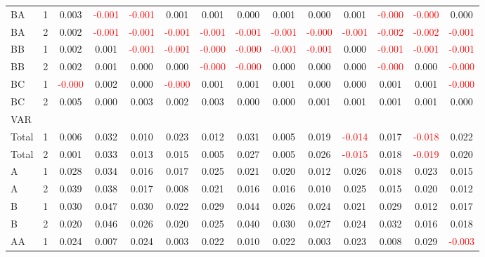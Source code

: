 \begin{table}[!htb]
{\begin{tabular}{llcccccccccccc}
BA & 1 & 0.003 & \textcolor{red}{-0.001} & \textcolor{red}{-0.001} & 0.001 & 0.001 & 0.000 & 0.001 & 0.000 & 0.001 & \textcolor{red}{-0.000} & \textcolor{red}{-0.000} & 0.000\\
BA & 2 & 0.002 & \textcolor{red}{-0.001} & \textcolor{red}{-0.001} & \textcolor{red}{-0.001} & \textcolor{red}{-0.001} & \textcolor{red}{-0.001} & \textcolor{red}{-0.001} & \textcolor{red}{-0.000} & \textcolor{red}{-0.001} & \textcolor{red}{-0.002} & \textcolor{red}{-0.002} & \textcolor{red}{-0.001}\\
BB & 1 & 0.002 & 0.001 & \textcolor{red}{-0.001} & \textcolor{red}{-0.001} & \textcolor{red}{-0.000} & \textcolor{red}{-0.000} & \textcolor{red}{-0.001} & \textcolor{red}{-0.001} & 0.000 & \textcolor{red}{-0.001} & \textcolor{red}{-0.001} & \textcolor{red}{-0.001}\\
BB & 2 & 0.002 & 0.001 & 0.000 & 0.000 & \textcolor{red}{-0.000} & \textcolor{red}{-0.000} & 0.000 & 0.000 & 0.000 & \textcolor{red}{-0.000} & 0.000 & \textcolor{red}{-0.000}\\
BC & 1 & \textcolor{red}{-0.000} & 0.002 & 0.000 & \textcolor{red}{-0.000} & 0.001 & 0.001 & 0.001 & 0.000 & 0.000 & 0.001 & 0.001 & \textcolor{red}{-0.000}\\
BC & 2 & 0.005 & 0.000 & 0.003 & 0.002 & 0.003 & 0.000 & 0.000 & 0.001 & 0.001 & 0.001 & 0.001 & 0.000\\
\hline
VAR &  &  &  &  &  &  &  &  &  &  &  &  & \\
\hline
Total & 1 & 0.006 & 0.032 & 0.010 & 0.023 & 0.012 & 0.031 & 0.005 & 0.019 & \textcolor{red}{-0.014} & 0.017 & \textcolor{red}{-0.018} & 0.022\\
Total & 2 & 0.001 & 0.033 & 0.013 & 0.015 & 0.005 & 0.027 & 0.005 & 0.026 & \textcolor{red}{-0.015} & 0.018 & \textcolor{red}{-0.019} & 0.020\\
A & 1 & 0.028 & 0.034 & 0.016 & 0.017 & 0.025 & 0.021 & 0.020 & 0.012 & 0.026 & 0.018 & 0.023 & 0.015\\
A & 2 & 0.039 & 0.038 & 0.017 & 0.008 & 0.021 & 0.016 & 0.016 & 0.010 & 0.025 & 0.015 & 0.020 & 0.012\\
B & 1 & 0.030 & 0.047 & 0.030 & 0.022 & 0.029 & 0.044 & 0.026 & 0.024 & 0.021 & 0.029 & 0.012 & 0.017\\
B & 2 & 0.020 & 0.046 & 0.026 & 0.020 & 0.025 & 0.040 & 0.030 & 0.027 & 0.024 & 0.032 & 0.016 & 0.018\\
AA & 1 & 0.024 & 0.007 & 0.024 & 0.003 & 0.022 & 0.010 & 0.022 & 0.003 & 0.023 & 0.008 & 0.029 & \textcolor{red}{-0.003}\\

\end{tabular}}
\end{table}
